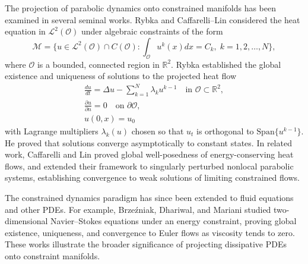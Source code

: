 \documentclass[reqno]{amsart}
\begin{document}
The projection of parabolic dynamics onto constrained manifolds has been examined in
several seminal works. Rybka \cite{Rybka} and Caffarelli--Lin \cite{Cafe} considered
the heat equation in $\mathcal{L}^{2}(\mathcal{O})$ under algebraic constraints of the
form
\begin{equation*}
\mathcal{M} = \big\{ u \in \mathcal{L}^{2}(\mathcal{O}) \cap C(\mathcal{O})
: \int_{\mathcal{O}} u^{k}(x)  dx = C_{k},\;  k = 1, 2, \dots, N \big\},
\end{equation*}
where $\mathcal{O}$ is a bounded, connected region in $\mathbb{R}^{2}$.
Rybka established the global existence and uniqueness of solutions to the projected
heat flow
\begin{equation}
\begin{gathered}
\frac{d u}{d t} = \Delta u - \sum_{k=1}^{N} \lambda_{k} u^{k-1} \quad
 \text{in } \mathcal{O} \subset \mathbb{R}^{2}, \\
\frac{\partial u}{\partial n} = 0 \quad \text{on } \partial \mathcal{O}, \\
u(0,x) = u_{0}
\end{gathered} \label{eq1}
\end{equation}
with Lagrange multipliers $\lambda_{k}(u)$ chosen so that $u_{t}$ is orthogonal
to $\mathrm{Span}\{u^{k-1}\}$. He proved that solutions converge asymptotically to
constant states. In related work, Caffarelli and Lin \cite{Cafe} proved global
well-posedness of energy-conserving heat flows, and extended their framework to
singularly perturbed nonlocal parabolic systems, establishing convergence to weak
solutions of limiting constrained flows.

The constrained dynamics paradigm has since been extended to fluid equations and
other PDEs. For example, Brze\'zniak, Dhariwal, and Mariani \cite{Gaurav}
studied two-dimensional Navier--Stokes equations under an energy constraint,
proving global existence, uniqueness, and convergence to Euler flows as viscosity
tends to zero. These works illustrate the broader significance of projecting
dissipative PDEs onto constraint manifolds.
\end{document}
